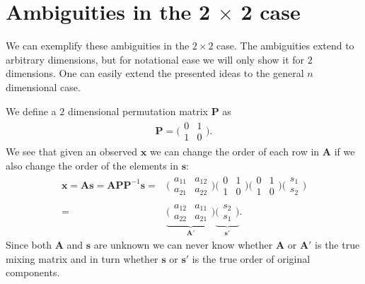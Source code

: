 
\section{Ambiguities in the 2 \texorpdfstring{$\times$}{TEXT} 2 case}\label{app:2x2-case}

We can exemplify these ambiguities in the $2 \times 2$ case. The ambiguities extend to arbitrary dimensions, but for notational ease we will only show it for $2$ dimensions. One can easily extend the presented ideas to the general $n$ dimensional case.

		We define a $2$ dimensional permutation matrix $\textbf{P}$ as
			\begin{align*}
				\textbf{P}= \bigg(\begin{array}{rr}
				0 & 1 \\
				1 & 0
			\end{array}\bigg).
			\end{align*} 
		We see that given an observed $\textbf{x}$ we can change the order of each row in $\textbf{A}$ if we also change the order of the elements in $\textbf{s}$:
		\begin{align*}
			\textbf{x}=\textbf{A}\textbf{s}=\textbf{A}\textbf{P}\textbf{P}^{-1}\textbf{s}=&
			\bigg(\begin{array}{rr}
				a_{11} & a_{12} \\
				a_{21} & a_{22} 
			\end{array}\bigg)\bigg(\begin{array}{rr}
				0 & 1 \\
				1 & 0
			\end{array}\bigg)\bigg(\begin{array}{rr}
				0 & 1 \\
				1 & 0
			\end{array}\bigg)\bigg(\begin{array}{r}
				s_1\\
				s_2
			\end{array}\bigg)\\ %
			=&\underbrace{\bigg(\begin{array}{rr}
				a_{12} & a_{11} \\
				a_{22} & a_{21}
			\end{array}\bigg)}_{\textbf{A}'}\underbrace{\bigg(\begin{array}{r}
				s_2\\
				s_1
			\end{array}\bigg)}_{\textbf{s}'}.
		\end{align*} 
		Since both $\textbf{A}$ and $\textbf{s}$ are unknown we can never know whether $\textbf{A}$ or $\textbf{A}'$ is the true mixing matrix and in turn whether $\textbf{s}$ or $\textbf{s}'$ is the true order of original components.

